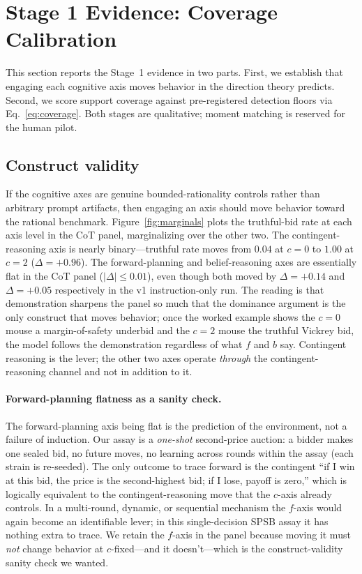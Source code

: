 \documentclass[12pt]{article}
\newcommand{\SPSB}{SPSB}
\begin{document}
\section{Stage 1 Evidence: Coverage Calibration}
\label{sec:stage1}

This section reports the Stage~1 evidence in two parts. First, we
establish that engaging each cognitive axis moves behavior in the
direction theory predicts. Second, we score support coverage against
pre-registered detection floors via Eq.~\eqref{eq:coverage}. Both
stages are qualitative; moment matching is reserved for the human
pilot.

\subsection{Construct validity}
\label{sec:construct}

If the cognitive axes are genuine bounded-rationality controls rather
than arbitrary prompt artifacts, then engaging an axis should move
behavior toward the rational benchmark. Figure~\ref{fig:marginals}
plots the truthful-bid rate at each axis level in the CoT panel,
marginalizing over the other two. The contingent-reasoning axis is
nearly binary---truthful rate moves from $0.04$ at $c{=}0$ to $1.00$
at $c{=}2$ ($\Delta=+0.96$). The forward-planning and belief-reasoning
axes are essentially flat in the CoT panel ($|\Delta|\le 0.01$), even
though both moved by $\Delta=+0.14$ and $\Delta=+0.05$ respectively in
the v1 instruction-only run. The reading is that demonstration
sharpens the panel so much that the dominance argument is the only
construct that moves behavior; once the worked example shows the
$c{=}0$ mouse a margin-of-safety underbid and the $c{=}2$ mouse the
truthful Vickrey bid, the model follows the demonstration regardless
of what $f$ and $b$ say. Contingent reasoning is the lever; the other
two axes operate \emph{through} the contingent-reasoning channel and
not in addition to it.

\paragraph{Forward-planning flatness as a sanity check.} The
forward-planning axis being flat is the prediction of the
environment, not a failure of induction. Our assay is a
\emph{one-shot} second-price auction: a bidder makes one sealed bid,
no future moves, no learning across rounds within the assay (each
strain is re-seeded). The only outcome to trace forward is the
contingent ``if I win at this bid, the price is the second-highest
bid; if I lose, payoff is zero,'' which is logically equivalent to
the contingent-reasoning move that the $c$-axis already controls. In
a multi-round, dynamic, or sequential mechanism the $f$-axis would
again become an identifiable lever; in this single-decision \SPSB{}
assay it has nothing extra to trace. We retain the $f$-axis in the
panel because moving it must \emph{not} change behavior at
$c$-fixed---and it doesn't---which is the construct-validity
sanity check we wanted.
\end{document}
